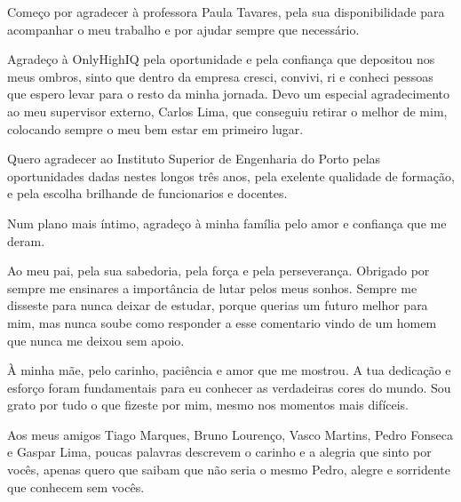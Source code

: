 \begin{acknowledgements}

Começo por agradecer à professora Paula Tavares, pela sua disponibilidade para acompanhar o meu trabalho e por ajudar sempre que necessário.

Agradeço à OnlyHighIQ pela oportunidade e pela confiança que depositou nos meus ombros, sinto que dentro da empresa cresci, convivi, ri e conheci pessoas que espero levar para o resto da minha jornada. Devo um especial agradecimento ao meu supervisor externo, Carlos Lima, que conseguiu retirar o melhor de mim, colocando sempre o meu bem estar em primeiro lugar.

Quero agradecer ao Instituto Superior de Engenharia do Porto pelas oportunidades dadas nestes longos três anos, pela exelente qualidade de formação, e pela escolha brilhande de funcionarios e docentes.

Num plano mais íntimo, agradeço à minha família pelo amor e confiança que me deram.

Ao meu pai, pela sua sabedoria, pela força e pela perseverança. Obrigado por sempre me ensinares a importância de lutar pelos meus sonhos. Sempre me disseste para nunca deixar de estudar, porque querias um futuro melhor para mim, mas nunca soube como responder a esse comentario vindo de um homem que nunca me deixou sem apoio.

À minha mãe, pelo carinho, paciência e amor que me mostrou. A tua dedicação e esforço foram fundamentais para eu conhecer as verdadeiras cores do mundo. Sou grato por tudo o que fizeste por mim, mesmo nos momentos mais difíceis. 

Aos meus amigos Tiago Marques, Bruno Lourenço, Vasco Martins, Pedro Fonseca e Gaspar Lima, poucas palavras descrevem o carinho e a alegria que sinto por vocês, apenas quero que saibam que não seria o mesmo Pedro, alegre e sorridente que conhecem sem vocês.

\end{acknowledgements}



\tableofcontents %

\listoffigures %

\listoftables %

